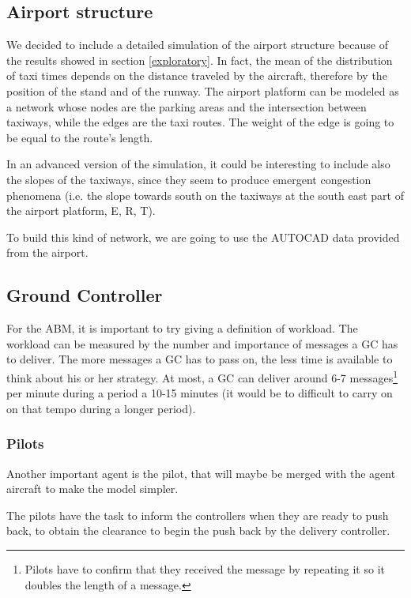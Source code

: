\documentclass{article}
\begin{document}
\subsection{Airport structure}

We decided to include a detailed simulation of the airport structure because of the results showed in section \ref{exploratory}. In fact, the mean of the distribution of taxi times depends on the distance traveled by the aircraft, therefore by the position of the stand and of the runway. The airport platform can be modeled as a network whose nodes are the parking areas and the intersection between taxiways, while the edges are the taxi routes. The weight of the edge is going to be equal to the route's length.

In an advanced version of the simulation, it could be interesting to include also the slopes of the taxiways, since they seem to produce emergent congestion phenomena (i.e. the slope towards south on the taxiways at the south east part of the airport platform, E, R, T).

To build this kind of network, we are going to use the AUTOCAD data provided from the airport.

\subsection{Ground Controller}

For the ABM, it is important to try giving a definition of workload. The workload can be measured by the number and importance of messages a GC has to deliver. The more messages a GC has to pass on, the less time is available to think about his or her strategy. At most, a GC can deliver around 6-7 messages\footnote{Pilots have to confirm that they received the message by repeating it so it doubles the length of a message.} per minute during a period a 10-15 minutes (it would be to difficult to carry on on that tempo during a longer period). 

\subsubsection{Pilots}

Another important agent is the pilot, that will maybe be merged with the agent aircraft to make the model simpler. 

The pilots have the task to inform the controllers when they are ready to push back, to obtain the clearance to begin the push back by the delivery controller.
\end{document}
